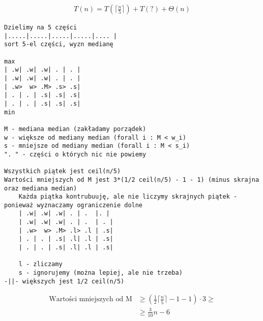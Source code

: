 \documentclass{article}
\numberwithin{equation}{subsection}
\begin{document}
\begin{align}
    T(n) = T\left(\lceil \frac{n}{5} \rceil\right) + T(?) + \Theta(n)
\end{align}

\begin{verbatim}
Dzielimy na 5 części
|.....|.....|.....|.....|.... |
sort 5-el części, wyzn medianę

max
| .w| .w| .w| . | . |
| .w| .w| .w| . | . |
| .w>  w> .M> .s> .s|
| . | . | .s| .s| .s|
| . | . | .s| .s| .s|
min

M - mediana median (zakładamy porządek)
w - większe od mediany median (forall i : M < w_i)
s - mniejsze od mediany median (forall i : M < s_i)
". " - części o których nic nie powiemy

Wszystkich piątek jest ceil(n/5)
Wartości mniejszych od M jest 3*(1/2 ceil(n/5) - 1 - 1) (minus skrajna oraz mediana median)
    Każda piątka kontrubuuję, ale nie liczymy skrajnych piątek - ponieważ wyznaczamy ograniczenie dolne
    | .w| .w| .w| . | .  |. |
    | .w| .w| .w| . | .  | . |
    | .w>  w> .M> .l> .l | .s|
    | . | . | .s| .l| .l | .s|
    | . | . | .s| .l| .l | .s|

    l - zliczamy
    s - ignorujemy (można lepiej, ale nie trzeba)
-||- większych jest 1/2 ceil(n/5)
\end{verbatim}

\begin{align}
    \text{Wartości mniejszych od M} &\geq \left(\frac{1}{2} \lceil \frac{n}{5} \rceil - 1 - 1\right) \cdot 3 \geq \\
    &\geq \frac{3}{10}n - 6
\end{align}
\end{document}
